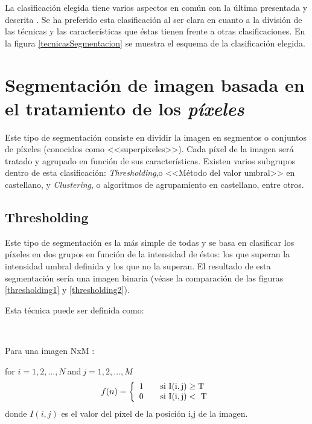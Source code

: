 La clasificaci\'{o}n elegida tiene varios aspectos en com\'{u}n con la \'{u}ltima presentada y descrita \cite{basa1}. Se ha preferido esta clasificaci\'{o}n al ser clara en cuanto a la divisi\'{o}n de las t\'{e}cnicas y las caracter\'{i}sticas que \'{e}stas tienen frente a otras clasificaciones. En la figura  \ref{tecnicasSegmentacion} se muestra el esquema de la clasificaci\'{o}n elegida.

\section{Segmentaci\'{o}n de imagen basada en el tratamiento de los \textit{p\'{i}xeles}}\label{cap:tratPixel}

Este tipo de segmentaci\'{o}n consiste en dividir la imagen en segmentos o  conjuntos de p\'{i}xeles (conocidos como <<superp\'{i}xeles>>). Cada p\'{i}xel de la imagen ser\'{a} tratado y agrupado en funci\'{o}n de sus caracter\'{i}sticas. Existen varios subgrupos dentro de esta clasificaci\'{o}n: \textit{Thresholding},o <<M\'{e}todo del valor umbral>> en castellano, y \textit{Clustering}, o algoritmos de agrupamiento en castellano, entre otros.

\subsection{Thresholding}

Este tipo de segmentaci\'{o}n es la m\'{a}s simple de todas y se basa en clasificar los p\'{i}xeles en dos grupos en funci\'{o}n de la intensidad de \'{e}stos: los que superan la intensidad umbral definida y los que no la superan. El resultado de esta segmentaci\'{o}n ser\'{i}a una imagen binaria (v\'{e}ase la comparaci\'{o}n de las figuras \ref{thresholding1} y \ref{thresholding2}). 

Esta t\'{e}cnica puede ser definida como:

\

Para una imagen NxM :

for $i = 1,2, ... , N \ $and$ \ j = 1,2, ... , M $
\begin{equation}
 f(n) = \left\{ 
\begin{array}{l l}
1 & \quad \mathrm{si \ I(i,j) \ge T}\\
0 & \quad \mathrm{si \ I(i,j) <\ T}
\end{array} \right. 
\end{equation}
donde $I(i,j)$ es el valor del p\'{i}xel de la posici\'{o}n i,j de la imagen.


